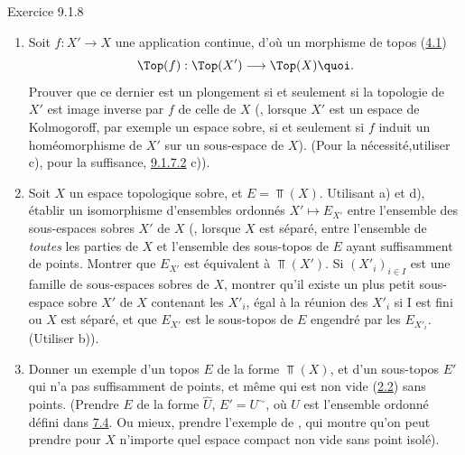 \begin{enonce*}[remark]{Exercice 9.1.8}
\begin{enumerate}
\item Soit $f:X'\rightarrow X$ une application continue, d'où un
morphisme de topos (\hyperref[IV.subsec4.1]{4.1})
$$
\Top(f):\Top(X')\longrightarrow \Top(X){\quoi}.
$$
Prouver que ce dernier est un plongement si et seulement si la
topologie de $X'$ est image inverse par $f$ de celle de $X$ (\ie,
lorsque $X'$ est un espace de Kolmogoroff, par exemple un espace
sobre, si et seulement si $f$ induit un homéomorphisme de $X'$ sur
un sous-espace de $X$). (Pour la nécessité,\pageoriginale utiliser
c), pour la suffisance, \hyperref[IV.exer9.1.7.2]{9.1.7.2} c)).

\item Soit $X$ un espace topologique sobre, et $E=\Top(X)$. Utilisant
a) et d), établir un isomorphisme d'ensembles ordonnés $X'\mapsto
E_{X'}$ entre l'ensemble des sous-espaces sobres $X'$ de $X$ (\ie,
lorsque $X$ est séparé, entre l'ensemble de \emph{toutes} les
parties de $X$ et l'ensemble des sous-topos de $E$ ayant
suffisamment de points. Montrer que $E_{X'}$ est équivalent à
$\Top(X')$. Si $(X'_i)_{i\in I}$ est une famille de sous-espaces
sobres de $X$, montrer qu'il existe un plus petit sous-espace sobre
$X'$ de $X$ contenant les $X'_i$, égal à la réunion des $X'_i$ si I
est fini ou $X$ est séparé, et que $E_{X'}$ est le sous-topos de $E$
engendré par les $E_{X'_i}$. (Utiliser b)).

\item Donner un exemple d'un topos $E$ de la forme $\Top(X)$, et d'un
sous-topos $E'$ qui n'a pas suffisamment de points, et même qui est
non vide (\hyperref[IV.subsec2.2]{2.2}) sans points. (Prendre $E$ de la forme
$\widehat{U}$, $E'=U^{\sim}$, où $U$ est l'ensemble ordonné défini
dans \hyperref[IV.subsec7.4]{7.4}. Ou mieux, prendre l'exemple de ,
qui montre qu'on peut prendre pour $X$ n'importe quel espace compact
non vide sans point isolé).
\end{enumerate}
\end{enonce*}

